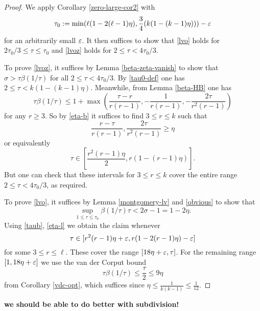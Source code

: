 \begin{proof} We apply Corollary \ref{zero-large-cor2} with
\begin{equation}\label{tau0-def}
\tau_0 := \min( \ell (1 - 2(\ell-1) \eta), \frac{3}{4} (k(1-(k-1)\eta)) ) - \varepsilon
\end{equation}
for an arbitrarily small $\varepsilon$.
It then suffices to show that \eqref{lvo} holds for $2\tau_0/3 \leq \tau \leq \tau_0$ and \eqref{lvoz} holds for $2 \leq \tau < 4\tau_0/3$.

To prove \eqref{lvoz}, it suffices by Lemma \ref{beta-zeta-vanish} to show that $\sigma > \tau \beta(1/\tau)$ for all $2 \leq \tau < 4 \tau_0/3$.  By \eqref{tau0-def} one has $2 \leq \tau < k(1-(k-1)\eta)$.  Meanwhile, from Lemma \ref{beta-HB} one has
\begin{equation}\label{taub}
\tau \beta(1/\tau) \leq 1 + \max\left( \frac{\tau-r}{r(r-1)}, -\frac{1}{r(r-1)}, - \frac{2\tau}{r^2(r-1)}\right)
\end{equation}
for any $r \geq 3$.  So by \eqref{eta-b} it suffices to find $3 \leq r \leq k$ such that
$$ \frac{r-\tau}{r(r-1)}, \frac{2\tau}{r^2(r-1)} \geq \eta$$
or equivalently
$$ \tau \in [\frac{r^2(r-1)\eta}{2}, r(1-(r-1)\eta)].$$
But one can check that these intervals for $3 \leq r \leq k$ cover the entire range $2 \leq \tau < 4\tau_0/3$, as required.

To prove \eqref{lvo}, it suffices by Lemma \ref{montgomery-lv} and \eqref{obvious} to show that
$$ \sup_{1 \leq \tau \leq \tau_0} \beta(1/\tau) \tau < 2\sigma - 1 = 1 - 2 \eta.$$
Using \eqref{taub}, \eqref{eta-l} we obtain the claim whenever
$$ \tau \in [r^2(r-1)\eta+\varepsilon, r(1-2(r-1)\eta)-\varepsilon]$$
for some $3 \leq r \leq \ell$.  These cover the range $[18\eta+\varepsilon, \tau]$.  For the remaining range $[1, 18\eta+\varepsilon]$ we use the van der Corput bound
$$ \tau \beta(1/\tau) \leq \frac{\tau}{2} \leq 9 \eta$$
from Corollary \ref{vdc-opt}, which suffices since $\eta \leq \frac{1}{k(k-1)} \leq \frac{1}{12}$.
\end{proof}


{\bf we should be able to do better with subdivision!}

